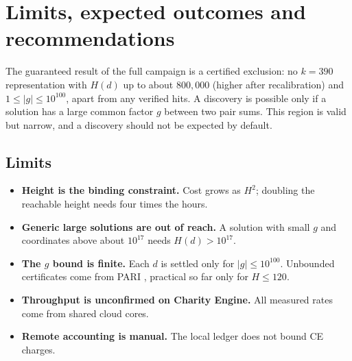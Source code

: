 \documentclass[11pt,a4paper]{article}
\newcommand{\code}[1]{\path{#1}}
\begin{document}
\section{Limits, expected outcomes and recommendations}

The guaranteed result of the full campaign is a certified exclusion: no $k=390$
representation with $H(d)$ up to about $800{,}000$ (higher after recalibration) and
$1\le|g|\le10^{100}$, apart from any verified hits. A discovery is possible only if a solution
has a large common factor $g$ between two pair sums. This region is valid but narrow, and a
discovery should not be expected by default.

\subsection{Limits}
\begin{itemize}[leftmargin=*]
  \item \textbf{Height is the binding constraint.} Cost grows as $H^2$; doubling the reachable
  height needs four times the hours.
  \item \textbf{Generic large solutions are out of reach.} A solution with small $g$ and
  coordinates above about $10^{17}$ needs $H(d)>10^{17}$.
  \item \textbf{The $g$ bound is finite.} Each $d$ is settled only for $|g|\le10^{100}$.
  Unbounded certificates come from PARI \code{thue()}, practical so far only for $H\le120$.
  \item \textbf{Throughput is unconfirmed on Charity Engine.} All measured rates come from
  shared cloud cores.
  \item \textbf{Remote accounting is manual.} The local ledger does not bound CE charges.
\end{itemize}
\end{document}

